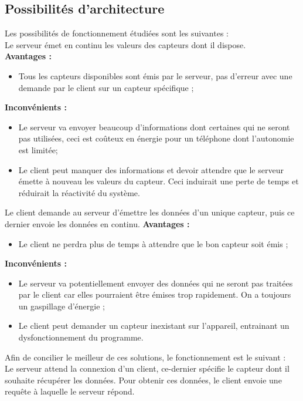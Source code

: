 \subsection{Possibilités d'architecture}
Les possibilités de fonctionnement étudiées sont les suivantes :\\

\vspace{0.5cm}
Le serveur émet en continu les valeurs des capteurs dont il dispose.\\
\textbf{Avantages :}
\begin{itemize}
\item Tous les capteurs disponibles sont émis par le serveur, pas d'erreur avec une demande par le client sur un capteur spécifique ;
\end{itemize}

\textbf{Inconvénients :}
\begin{itemize}
\item Le serveur va envoyer beaucoup d'informations dont certaines qui ne seront pas utilisées, ceci est coûteux en énergie pour un téléphone dont l'autonomie est limitée;
\item Le client peut manquer des informations et devoir attendre que le serveur émette à nouveau les valeurs du capteur. Ceci induirait une perte de temps et réduirait la réactivité du système.
\end{itemize}

\vspace{0.5cm}
Le client demande au serveur d'émettre les données d'un unique capteur, puis ce dernier envoie les données en continu.
\textbf{Avantages :}
\begin{itemize}
\item Le client ne perdra plus de temps à attendre que le bon capteur soit émis ;
\end{itemize}

\textbf{Inconvénients :}
\begin{itemize}
\item Le serveur va potentiellement envoyer des données qui ne seront pas traitées par le client car elles pourraient être émises trop rapidement. On a toujours un gaspillage d'énergie ;
\item Le client peut demander un capteur inexistant sur l'appareil, entrainant un dysfonctionnement du programme.
\end{itemize}

\vspace{0.5cm}
Afin de concilier le meilleur de ces solutions, le fonctionnement est le suivant :\\
\vspace{0.5mm}
Le serveur attend la connexion d'un client, ce-dernier spécifie le capteur dont il souhaite récupérer les données. Pour obtenir ces données, le client envoie une requête à laquelle le serveur répond.
 
